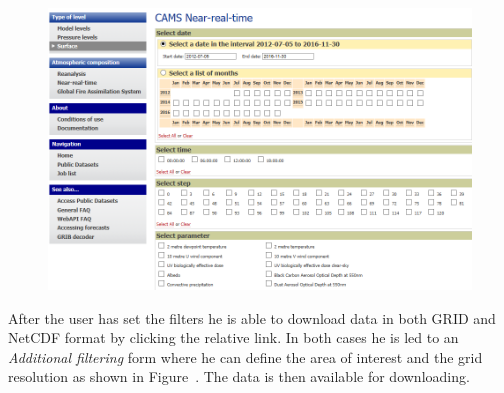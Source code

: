 \documentclass[9pt]{report}
\begin{document}
\begin{figure}[h!]%
\begin{mdcenter}%

\noindent{}\includegraphics[keepaspectratio=true,width=\dimmin{}{\dimwidth{0.90}}]{images/global_real_time}{}%

\mdhr{}%

\noindent{}%
\end{mdcenter}\label{global-data}%
\end{figure}%

\noindent{}After the user has set the filters he is able to download data in both GRID and NetCDF format by clicking the relative link.
In both cases he is led to an \emph{Additional filtering} form where he can define the area of interest and the grid resolution as shown in Figure~.
The data is then available for downloading.%
\end{document}

